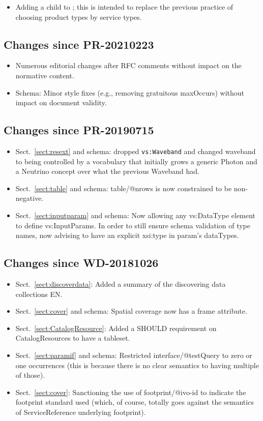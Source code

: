 \documentclass[11pt,a4paper]{ivoa}
\begin{document}
\begin{itemize}
\item Adding a  child to ;
this is intended to replace the previous practice of choosing product
types by service types.
\end{itemize}

\subsection{Changes since PR-20210223}

\begin{itemize}
\item Numerous editorial changes after RFC comments without
impact on the normative content.
\item Schema: Minor style fixes (e.g., removing gratuitous maxOccurs)
without impact on document validity.
\end{itemize}

\subsection{Changes since PR-20190715}

\begin{itemize}
\item Sect.~\ref{sect:resext} and schema:
dropped \verb|vs:Waveband| and changed waveband to being
controlled by a vocabulary that initially grows a generic Photon and a
Neutrino concept over what the previous Waveband had.
\item Sect.~\ref{sect:table} and schema: table/@nrows is now constrained to be non-negative.
\item Sect.~\ref{sect:inputparam} and schema:
Now allowing any vs:DataType element to define vs:InputParams.
In order to still ensure schema validation of type names,
now advising to have an explicit xsi:type in param's dataTypes.
\end{itemize}

\subsection{Changes since  WD-20181026}

\begin{itemize}
\item Sect.~\ref{sect:discoverdata}:
Added a summary of the discovering data collections EN.
\item Sect.~\ref{sect:cover} and schema:
Spatial coverage now has a frame attribute.
\item Sect.~\ref{sect:CatalogResource}:
Added a SHOULD requirement on CatalogResources to
have a tableset.
\item Sect.~\ref{sect:paramif} and schema:
Restricted interface/@testQuery to zero or one occurrences (this
is because there is no clear semantics to having multiple of those).
\item Sect.~\ref{sect:cover}:
Sanctioning the use of footprint/@ivo-id to indicate the footprint
standard used (which, of course, totally goes against the semantics of
ServiceReference underlying footprint).
\end{itemize}
\end{document}
